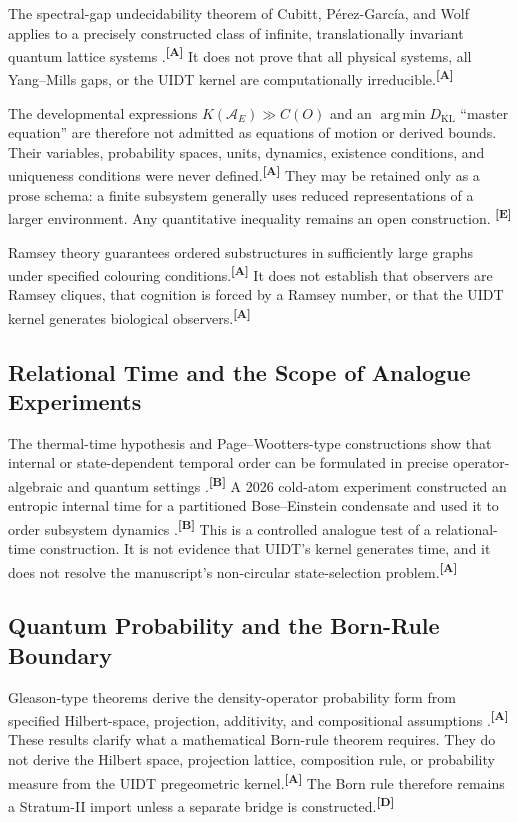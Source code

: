 \documentclass[12pt,a4paper,twoside]{article}
\theoremstyle{plain}
\theoremstyle{definition}
\theoremstyle{remark}
\newcommand{\catmark}[1]{\textsuperscript{\textsf{\textbf{[#1]}}}}
\begin{document}
The spectral-gap undecidability theorem of Cubitt, P\'erez-Garc\'ia, and Wolf
applies to a precisely constructed class of infinite, translationally invariant
quantum lattice systems \cite{cubitt2015}.\catmark{A} It does not prove that
all physical systems, all Yang--Mills gaps, or the UIDT kernel are
computationally irreducible.\catmark{A}

The developmental expressions $K(\mathcal A_E)\gg C(O)$ and an
$\operatorname*{arg\,min}D_{\mathrm{KL}}$ ``master equation'' are therefore
not admitted as equations of motion or derived bounds. Their variables,
probability spaces, units, dynamics, existence conditions, and uniqueness
conditions were never defined.\catmark{A} They may be retained only as a prose
schema: a finite subsystem generally uses reduced representations of a larger
environment. Any quantitative inequality remains an open construction.
\catmark{E}

Ramsey theory guarantees ordered substructures in sufficiently large graphs
under specified colouring conditions.\catmark{A} It does not establish that
observers are Ramsey cliques, that cognition is forced by a Ramsey number, or
that the UIDT kernel generates biological observers.\catmark{A}

\subsection{Relational Time and the Scope of Analogue Experiments}
\label{subsec:ctx-relational-time}

The thermal-time hypothesis and Page--Wootters-type constructions show that
internal or state-dependent temporal order can be formulated in precise
operator-algebraic and quantum settings
\cite{connesrovelli1994,pagewootters1983}.\catmark{B} A 2026 cold-atom
experiment constructed an entropic internal time for a partitioned Bose--Einstein
condensate and used it to order subsystem dynamics
\cite{barontini2026}.\catmark{B} This is a controlled analogue test of a
relational-time construction. It is not evidence that UIDT's kernel generates
time, and it does not resolve the manuscript's non-circular state-selection
problem.\catmark{A}

\subsection{Quantum Probability and the Born-Rule Boundary}
\label{subsec:ctx-born-boundary}

Gleason-type theorems derive the density-operator probability form from
specified Hilbert-space, projection, additivity, and compositional assumptions
\cite{gleason1957,frembs2023,fiorentino2026}.\catmark{A} These results clarify
what a mathematical Born-rule theorem requires. They do not derive the Hilbert
space, projection lattice, composition rule, or probability measure from the
UIDT pregeometric kernel.\catmark{A} The Born rule therefore remains a
Stratum-II import unless a separate bridge is constructed.\catmark{D}
\end{document}
